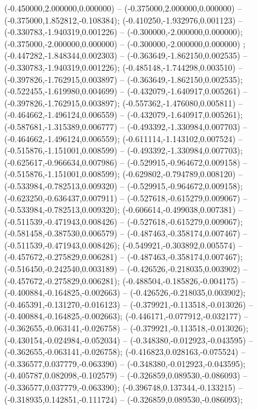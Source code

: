  (-0.450000,2.000000,0.000000) -- (-0.375000,2.000000,0.000000) -- (-0.375000,1.852812,-0.108384);
 (-0.410250,-1.932976,0.001123) -- (-0.330783,-1.940319,0.001226) -- (-0.300000,-2.000000,0.000000);
 (-0.375000,-2.000000,0.000000) -- (-0.300000,-2.000000,0.000000) ;
 (-0.447282,-1.848344,0.002303) -- (-0.363649,-1.862150,0.002535) -- (-0.330783,-1.940319,0.001226);
 (-0.485148,-1.744298,0.003510) -- (-0.397826,-1.762915,0.003897) -- (-0.363649,-1.862150,0.002535);
 (-0.522455,-1.619980,0.004699) -- (-0.432079,-1.640917,0.005261) -- (-0.397826,-1.762915,0.003897);
 (-0.557362,-1.476080,0.005811) -- (-0.464662,-1.496124,0.006559) -- (-0.432079,-1.640917,0.005261);
 (-0.587681,-1.315389,0.006777) -- (-0.493392,-1.330984,0.007703) -- (-0.464662,-1.496124,0.006559);
 (-0.611114,-1.143102,0.007524) -- (-0.515876,-1.151001,0.008599) -- (-0.493392,-1.330984,0.007703);
 (-0.625617,-0.966634,0.007986) -- (-0.529915,-0.964672,0.009158) -- (-0.515876,-1.151001,0.008599);
 (-0.629802,-0.794789,0.008120) -- (-0.533984,-0.782513,0.009320) -- (-0.529915,-0.964672,0.009158);
 (-0.623250,-0.636437,0.007911) -- (-0.527618,-0.615279,0.009067) -- (-0.533984,-0.782513,0.009320);
 (-0.606614,-0.499038,0.007381) -- (-0.511539,-0.471943,0.008426) -- (-0.527618,-0.615279,0.009067);
 (-0.581458,-0.387530,0.006579) -- (-0.487463,-0.358174,0.007467) -- (-0.511539,-0.471943,0.008426);
 (-0.549921,-0.303892,0.005574) -- (-0.457672,-0.275829,0.006281) -- (-0.487463,-0.358174,0.007467);
 (-0.516450,-0.242540,0.003189) -- (-0.426526,-0.218035,0.003902) -- (-0.457672,-0.275829,0.006281);
 (-0.488504,-0.185826,-0.004175) -- (-0.400884,-0.164825,-0.002663) -- (-0.426526,-0.218035,0.003902);
 (-0.465391,-0.131270,-0.016123) -- (-0.379921,-0.113518,-0.013026) -- (-0.400884,-0.164825,-0.002663);
 (-0.446171,-0.077912,-0.032177) -- (-0.362655,-0.063141,-0.026758) -- (-0.379921,-0.113518,-0.013026);
 (-0.430154,-0.024984,-0.052034) -- (-0.348380,-0.012923,-0.043595) -- (-0.362655,-0.063141,-0.026758);
 (-0.416823,0.028163,-0.075524) -- (-0.336577,0.037779,-0.063390) -- (-0.348380,-0.012923,-0.043595);
 (-0.405787,0.082098,-0.102579) -- (-0.326859,0.089530,-0.086093) -- (-0.336577,0.037779,-0.063390);
 (-0.396748,0.137344,-0.133215) -- (-0.318935,0.142851,-0.111724) -- (-0.326859,0.089530,-0.086093);
